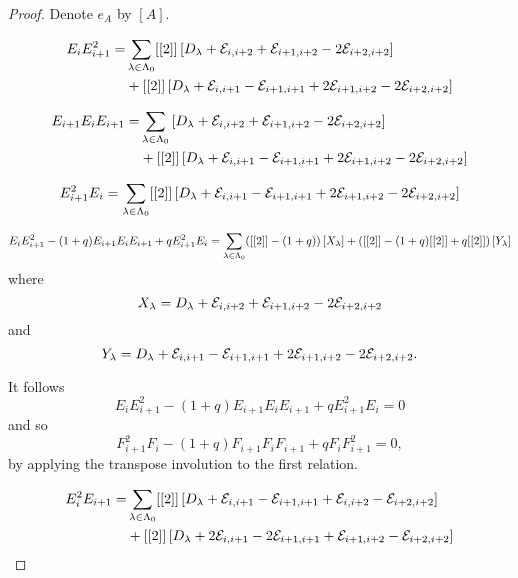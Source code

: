 \documentclass[a4paper, 11pt]{report}
\begin{document}
\begin{proof}
Denote $e_A$ by $\left[A\right]$.

\begin{align*}
E_i E_{i+1}^2 = &\sum_{\lambda\in\Lambda_0{}} [[2]]\left[D_{\lambda} +\mathcal{E}_{i,i+2} +\mathcal{E}_{i+1,i+2} -2\mathcal{E}_{i+2,i+2}\right]\\
&+[[2]]\left[D_{\lambda} +\mathcal{E}_{i,i+1} -\mathcal{E}_{i+1,i+1} +2\mathcal{E}_{i+1,i+2} - 2\mathcal{E}_{i+2,i+2}\right]
\end{align*}

\begin{align*}
E_{i+1}E_i E_{i+1} = &\sum_{\lambda\in\Lambda_0{}} \left[D_{\lambda} +\mathcal{E}_{i,i+2} +\mathcal{E}_{i+1,i+2} - 2\mathcal{E}_{i+2,i+2}\right]\\
&+[[2]]\left[D_{\lambda} +\mathcal{E}_{i,i+1} -\mathcal{E}_{i+1,i+1} +2\mathcal{E}_{i+1,i+2} -2\mathcal{E}_{i+2,i+2}\right]
\end{align*}

\begin{equation*}
E_{i+1}^2 E_i = \sum_{\lambda\in\Lambda_0{}} [[2]]\left[D_{\lambda} +\mathcal{E}_{i,i+1} -\mathcal{E}_{i+1,i+1} +2\mathcal{E}_{i+1,i+2} -2\mathcal{E}_{i+2,i+2}\right]
\end{equation*}

\begin{equation*}
E_i E_{i+1}^2 - (1+q)E_{i+1} E_i E_{i+1} + qE_{i+1}^2 E_i = \sum_{\lambda\in\Lambda_0{}} ([[2]] -(1+q))\left[X_\lambda\right] + ([[2]] -(1+q)[[2]] +q[[2]])\left[Y_\lambda\right]
\end{equation*}
where
\begin{equation*}
X_\lambda=D_{\lambda} +\mathcal{E}_{i,i+2} +\mathcal{E}_{i+1,i+2} -2\mathcal{E}_{i+2,i+2}
\end{equation*}
and
\begin{equation*}
Y_\lambda=D_{\lambda} +\mathcal{E}_{i,i+1} -\mathcal{E}_{i+1,i+1} +2\mathcal{E}_{i+1,i+2} -2\mathcal{E}_{i+2,i+2}.
\end{equation*}

It follows
\begin{equation*}
E_i E_{i+1}^2 -(1+q)E_{i+1} E_i E_{i+1} +qE_{i+1}^2 E_i = 0
\end{equation*}
and so
\begin{equation*}
F_{i+1}^2F_i -(1+q)F_{i+1}F_iF_{i+1} +qF_iF_{i+1}^2 = 0,
\end{equation*}
by applying the transpose involution to the first relation.

\begin{align*}
E_i^2E_{i+1} = &\sum_{\lambda\in\Lambda_0{}} [[2]]\left[D_{\lambda} +\mathcal{E}_{i,i+1} -\mathcal{E}_{i+1,i+1} +\mathcal{E}_{i,i+2} -\mathcal{E}_{i+2,i+2}\right]\\
&+[[2]]\left[D_{\lambda} +2\mathcal{E}_{i,i+1} -2\mathcal{E}_{i+1,i+1} +\mathcal{E}_{i+1,i+2} - \mathcal{E}_{i+2,i+2}\right]
\end{align*}


\end{proof}
\end{document}
